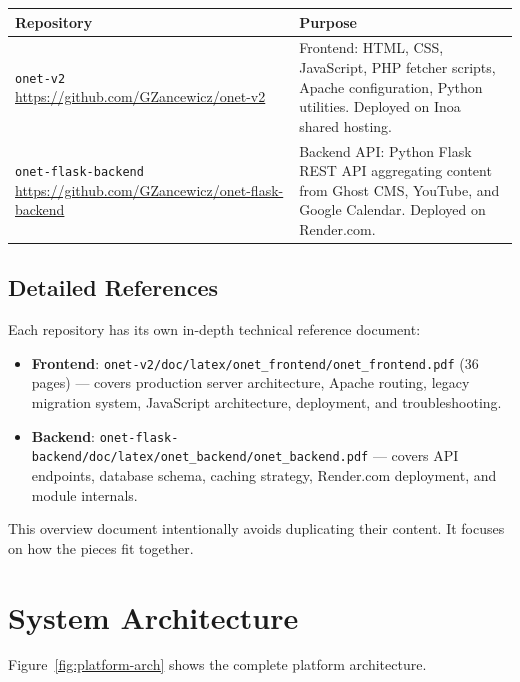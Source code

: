 \documentclass[12pt]{article}
\begin{document}
\begin{longtable}{p{4cm}p{8.5cm}}
\toprule
\textbf{Repository} & \textbf{Purpose} \\
\midrule
\texttt{onet-v2} \newline \url{https://github.com/GZancewicz/onet-v2} & Frontend: HTML, CSS, JavaScript, PHP fetcher scripts, Apache configuration, Python utilities. Deployed on Inoa shared hosting. \\
\midrule
\texttt{onet-flask-backend} \newline \url{https://github.com/GZancewicz/onet-flask-backend} & Backend API: Python Flask REST API aggregating content from Ghost CMS, YouTube, and Google Calendar. Deployed on Render.com. \\
\bottomrule
\end{longtable}

\subsection{Detailed References}

Each repository has its own in-depth technical reference document:

\begin{itemize}
    \item \textbf{Frontend}: \texttt{onet-v2/doc/latex/onet\_frontend/onet\_frontend.pdf} (36 pages) --- covers production server architecture, Apache routing, legacy migration system, JavaScript architecture, deployment, and troubleshooting.
    \item \textbf{Backend}: \texttt{onet-flask-backend/doc/latex/onet\_backend/onet\_backend.pdf} --- covers API endpoints, database schema, caching strategy, Render.com deployment, and module internals.
\end{itemize}

This overview document intentionally avoids duplicating their content. It focuses on how the pieces fit together.

\section{System Architecture}

Figure~\ref{fig:platform-arch} shows the complete platform architecture.
\end{document}
